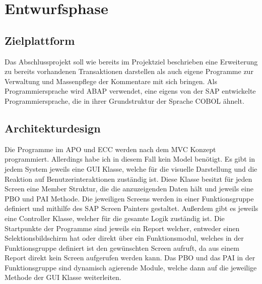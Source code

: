 \section{Entwurfsphase} 
\label{sec:Entwurfsphase}

\subsection{Zielplattform}
\label{sec:Zielplattform}
Das Abschlussprojekt soll wie bereits im Projektziel beschrieben eine Erweiterung zu bereits vorhandenen Transaktionen darstellen als auch eigene Programme zur Verwaltung und Massenpflege der Kommentare mit sich bringen. Als Programmiersprache wird \ac{ABAP} verwendet, eine eigens von der SAP entwickelte Programmiersprache, die in ihrer Grundstruktur der Sprache COBOL ähnelt.

\subsection{Architekturdesign}
\label{sec:Architekturdesign}
Die Programme im \ac{APO} und \ac{ECC} werden nach dem \ac{MVC} Konzept programmiert. Allerdings habe ich in diesem Fall kein Model benötigt. Es gibt in jedem System jeweils eine \ac{GUI} Klasse, welche für die visuelle Darstellung und die Reaktion auf Benutzerinteraktionen zuständig ist. Diese Klasse besitzt für jeden Screen eine Member Struktur, die die anzuzeigenden Daten hält und jeweils eine \ac{PBO} und \ac{PAI} Methode. Die jeweiligen Screens werden in einer Funktionsgruppe definiert und mithilfe des SAP Screen Painters gestaltet. Außerdem gibt es jeweils eine Controller Klasse, welcher für die gesamte Logik zuständig ist. Die Startpunkte der Programme sind jeweils ein Report welcher, entweder einen Selektionsbildschirm hat oder direkt über ein Funktionsmodul, welches in der Funktionsgruppe definiert ist den gewünschten Screen aufruft, da aus einem Report direkt kein Screen aufgerufen werden kann. Das \ac{PBO} und das \ac{PAI} in der Funktionsgruppe sind dynamisch agierende Module, welche dann auf die jeweilige Methode der \ac{GUI} Klasse weiterleiten.

